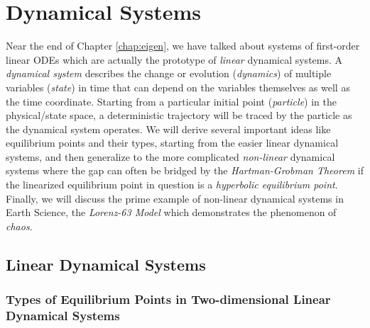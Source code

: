 \chapter{Dynamical Systems}
\label{chap:dynsys}

Near the end of Chapter \ref{chap:eigen}, we have talked about systems of first-order linear ODEs which are actually the prototype of \textit{linear} dynamical systems. A \textit{dynamical system} describes the change or evolution (\textit{dynamics}) of multiple variables (\textit{state}) in time that can depend on the variables themselves as well as the time coordinate. Starting from a particular initial point (\textit{particle}) in the physical/state space, a deterministic trajectory will be traced by the particle as the dynamical system operates. We will derive several important ideas like equilibrium points and their types, starting from the easier linear dynamical systems, and then generalize to the more complicated \textit{non-linear} dynamical systems where the gap can often be bridged by the \textit{Hartman-Grobman Theorem} if the linearized equilibrium point in question is a \textit{hyperbolic equilibrium point}. Finally, we will discuss the prime example of non-linear dynamical systems in Earth Science, the \textit{Lorenz-63 Model} which demonstrates the phenomenon of \textit{chaos}.

\section{Linear Dynamical Systems}

\subsection{Types of Equilibrium Points in Two-dimensional Linear Dynamical Systems}

